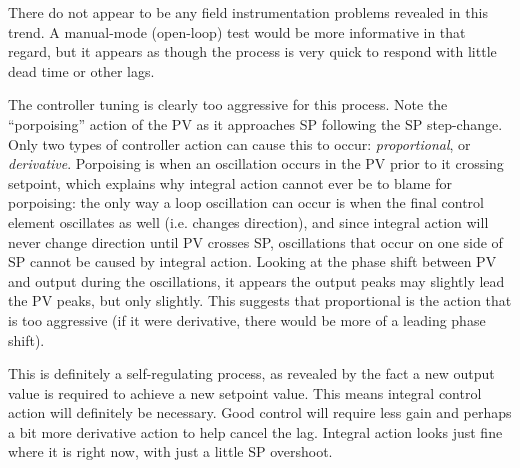 \vskip 10pt

There do not appear to be any field instrumentation problems revealed in this trend.  A manual-mode (open-loop) test would be more informative in that regard, but it appears as though the process is very quick to respond with little dead time or other lags.

\vskip 10pt
  
The controller tuning is clearly too aggressive for this process.  Note the ``porpoising'' action of the PV as it approaches SP following the SP step-change.  Only two types of controller action can cause this to occur: {\it proportional}, or {\it derivative}.  Porpoising is when an oscillation occurs in the PV prior to it crossing setpoint, which explains why integral action cannot ever be to blame for porpoising: the only way a loop oscillation can occur is when the final control element oscillates as well (i.e. changes direction), and since integral action will never change direction until PV crosses SP, oscillations that occur on one side of SP cannot be caused by integral action.  Looking at the phase shift between PV and output during the oscillations, it appears the output peaks may slightly lead the PV peaks, but only slightly.  This suggests that proportional is the action that is too aggressive (if it were derivative, there would be more of a leading phase shift).

\vskip 10pt

This is definitely a self-regulating process, as revealed by the fact a new output value is required to achieve a new setpoint value.  This means integral control action will definitely be necessary.  Good control will require less gain and perhaps a bit more derivative action to help cancel the lag.  Integral action looks just fine where it is right now, with just a little SP overshoot.











